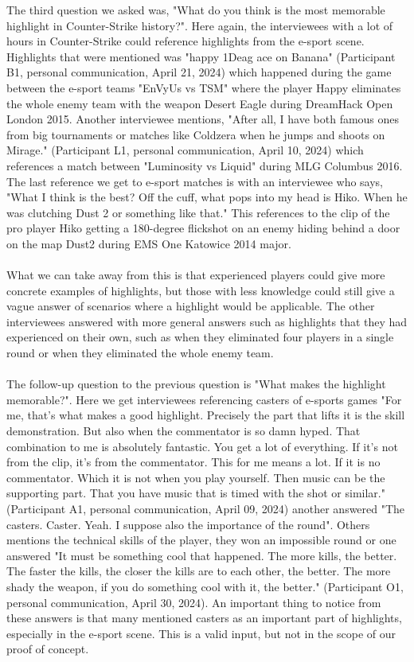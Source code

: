 The third question we asked was, "What do you think is the most memorable highlight in Counter-Strike history?". Here again, the interviewees with a lot of hours in Counter-Strike could reference highlights from the e-sport scene. Highlights that were mentioned was "happy 1Deag ace on Banana" (Participant B1, personal communication, April 21, 2024) which happened during the game between the e-sport teams "EnVyUs vs TSM" where the player Happy eliminates the whole enemy team with the weapon Desert Eagle during DreamHack Open London 2015. Another interviewee mentions, "After all, I have both famous ones from big tournaments or matches like Coldzera when he jumps and shoots on Mirage." 
(Participant L1, personal communication, April 10, 2024) which references a match between "Luminosity vs Liquid" during MLG Columbus 2016. The last reference we get to e-sport matches is with an interviewee who says, "What I think is the best? Off the cuff, what pops into my head is Hiko. When he was clutching Dust 2 or something like that." This references to the clip of the pro player Hiko getting a 180-degree flickshot on an enemy hiding behind a door on the map Dust2 during EMS One Katowice 2014 major.\\\\ 
What we can take away from this is that experienced players could give more concrete examples of highlights, but those with less knowledge could still give a vague answer of scenarios where a highlight would be applicable. 
The other interviewees answered with more general answers such as highlights that they had experienced on their own, such as when they eliminated four players in a single round or when they eliminated the whole enemy team.\\\\
The follow-up question to the previous question is "What makes the highlight memorable?". Here we get interviewees referencing casters of e-sports games "For me, that's what makes a good highlight. Precisely the part that lifts it is the skill demonstration. But also when the commentator is so damn hyped. That combination to me is absolutely fantastic. You get a lot of everything. If it's not from the clip, it's from the commentator. This for me means a lot. If it is no commentator. Which it is not when you play yourself. Then music can be the supporting part. That you have music that is timed with the shot or similar." (Participant A1, personal communication, April 09, 2024) another answered "The casters. Caster. Yeah. I suppose also the importance of the round". Others mentions the technical skills of the player, they won an impossible round or one answered "It must be something cool that happened. The more kills, the better. The faster the kills, the closer the kills are to each other, the better. The more shady the weapon, if you do something cool with it, the better." (Participant O1, personal communication, April 30, 2024). An important thing to notice from these answers is that many mentioned casters as an important part of highlights, especially in the e-sport scene. This is a valid input, but not in the scope of our proof of concept.\\\\
